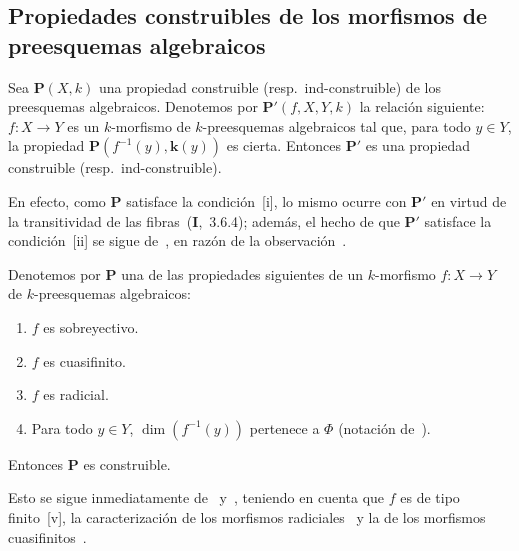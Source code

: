 \subsection{Propiedades construibles de los morfismos de preesquemas algebraicos}
\label{subsection:IV.9.3}

\begin{proposition}[9.3.1]
\label{IV.9.3.1}
Sea $\boldsymbol{P}(X,k)$ una propiedad construible \textnormal{(resp.}\ ind-construible\textnormal{)} de los preesquemas algebraicos.
Denotemos por $\boldsymbol{P}'(f,X,Y,k)$ la relación siguiente: $f:X\to Y$ es un $k$-morfismo de $k$-preesquemas algebraicos tal que, para todo $y\in Y$, la propiedad $\boldsymbol{P}(f^{-1}(y),\boldsymbol{k}(y))$ es cierta.
Entonces $\boldsymbol{P}'$ es una propiedad construible \textnormal{(resp.}\ ind-construible\textnormal{)}.
\end{proposition}

En efecto, como $\boldsymbol{P}$ satisface la condición~[i], lo mismo ocurre con $\boldsymbol{P}'$ en virtud de la transitividad de las fibras~(\textbf{I},~3.6.4); además, el hecho de que $\boldsymbol{P}'$ satisface la condición~[ii] se sigue de~, en razón de la observación~.

\begin{proposition}[9.3.2]
\label{IV.9.3.2}
Denotemos por $\boldsymbol{P}$ una de las propiedades siguientes de un $k$-morfismo $f:X\to Y$ de $k$-preesquemas algebraicos:
\begin{enumerate}[label=\textup{(\roman*)}]
  \item $f$ es sobreyectivo.
  \item $f$ es cuasifinito.
  \item $f$ es radicial.
  \item Para todo $y\in Y$, $\dim(f^{-1}(y))$ pertenece a $\Phi$ \textnormal{(}notación de~\textnormal{)}.
\end{enumerate}
Entonces $\boldsymbol{P}$ es construible.
\end{proposition}

Esto se sigue inmediatamente de~ y~, teniendo en cuenta que $f$ es de tipo finito~[v], la caracterización de los morfismos radiciales~ y la de los morfismos cuasifinitos~.

